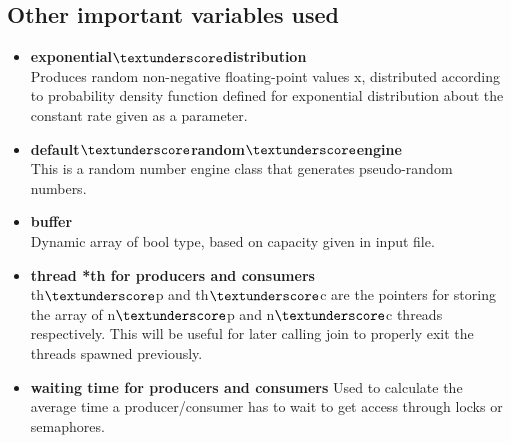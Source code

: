 \documentclass[12pt]{article}
\begin{document}
\subsection{Other important variables used}
\begin{itemize}
\item \textbf{exponential$\textunderscore$distribution}\\
Produces random non-negative floating-point values x, distributed according to probability density function defined for exponential distribution about the constant rate given as a parameter.
\item \textbf{default$\textunderscore$random$\textunderscore$engine}\\
This is a random number engine class that generates pseudo-random numbers.
\item \textbf{buffer}\\
Dynamic array of bool type, based on capacity given in input file.
\item \textbf{thread *th for producers and consumers}\\
th$\textunderscore$p and th$\textunderscore$c are the pointers for storing the array of n$\textunderscore$p and n$\textunderscore$c threads respectively. This will be useful for later calling join to properly exit the threads spawned previously.
\item \textbf{waiting time for producers and consumers}
Used to calculate the average time a producer/consumer has to wait to get access through locks or semaphores.
\end{itemize}
\end{document}
